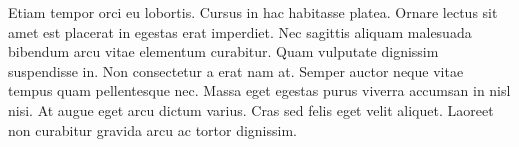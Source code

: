 Etiam tempor orci eu lobortis. Cursus in hac habitasse platea. Ornare lectus sit amet est placerat in egestas erat imperdiet. Nec sagittis aliquam malesuada bibendum arcu vitae elementum curabitur. Quam vulputate dignissim suspendisse in. Non consectetur a erat nam at. Semper auctor neque vitae tempus quam pellentesque nec. Massa eget egestas purus viverra accumsan in nisl nisi. At augue eget arcu dictum varius. Cras sed felis eget velit aliquet. Laoreet non curabitur gravida arcu ac tortor dignissim.